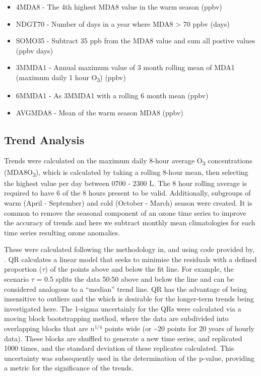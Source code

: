\documentclass[journal abbreviation, manuscript]{copernicus}
\begin{document}
\begin{itemize}
    \item 4MDA8 - The 4th highest MDA8 value in the warm season (ppbv)
    \item NDGT70 - Number of days in a year where MDA8 > 70 ppbv (days)
    \item SOMO35 - Subtract 35 ppb from the MDA8 value and sum all postive values (ppbv days)
    \item 3MMDA1 - Annual maximum value of 3 month rolling mean of MDA1 (maximum daily 1 hour O\textsubscript{3}) (ppbv)
    \item 6MMDA1 - As 3MMDA1 with a rolling 6 month mean (ppbv)
    \item AVGMDA8 - Mean of the warm season MDA8 (ppbv)
\end{itemize}

\subsection{Trend Analysis}

Trends were calculated on the maximum daily 8-hour average O\textsubscript{3} concentrations (MDA8O\textsubscript{3}), which is calculated by taking a rolling 8-hour mean, then selecting the highest value per day between 0700 - 2300 L. The 8 hour rolling average is required to have 6 of the 8 hours present to be valid. Additionally, subgroups of warm (April - September) and cold (October - March) season were created. It is common to remove the seasonal component of an ozone time series to improve the accuracy of trends \citep{cooper_2020} and here we subtract monthly mean climatologies for each time series resulting ozone anomalies. 

These were calculated following the methodology in, and using code provided by, \cite{chang2023guidancenotebeststatistical}. QR calculates a linear model that seeks to minimise the residuals with a defined proportion ($\tau$) of the points above and below the fit line. For example, the scenario $\tau$ = 0.5 splits the data 50:50 above and below the line and can be considered analogous to a “median” trend line. QR has the advantage of being insensitive to outliers and the which is desirable for the longer-term trends being investigated here. The 1-sigma uncertainly for the QRs were calculated via a moving block bootstrapping method, where the data are subdivided into overlapping blocks that are $n^{1/4}$ points wide (or \textasciitilde{20} points for 20 years of hourly data). These blocks are shuffled to generate a new time series, and replicated 1000 times, and the standard deviation of these replicates calculated. This uncertainty was subsequently used in the determination of the p-value, providing a metric for the significance of the trends. 
\end{document}
